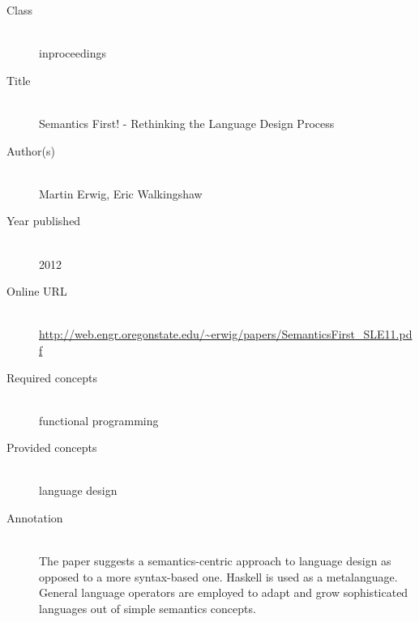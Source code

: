 \begin{description}
\item[Class]\mbox{}\\
inproceedings
\item[Title]\mbox{}\\
Semantics First! - Rethinking the Language Design Process
\item[Author(s)]\mbox{}\\
Martin Erwig, Eric Walkingshaw\item[Year published]\mbox{}\\
2012
\item[Online URL]\mbox{}\\
{\footnotesize\url{http://web.engr.oregonstate.edu/~erwig/papers/SemanticsFirst_SLE11.pdf}}
\item[Required concepts]\mbox{}\\
functional programming\item[Provided concepts]\mbox{}\\
language design\item[Annotation]\mbox{}\\
The paper suggests a semantics-centric approach to language design as opposed to a more syntax-based one. Haskell is used as a metalanguage. General language operators are employed to adapt and grow sophisticated languages out of simple semantics concepts.
\end{description}

